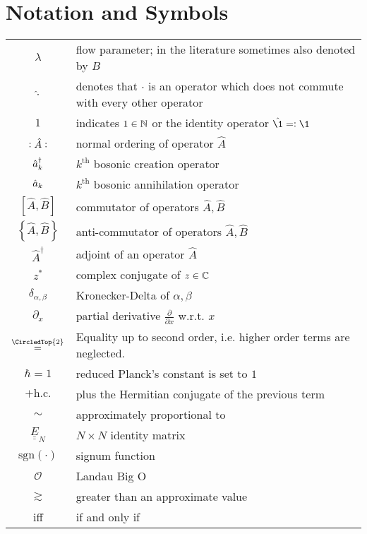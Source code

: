 \chapter*{Notation and Symbols}
\begin{tabular}{cp{}}
  $\lambda$ & flow parameter; in the literature sometimes also denoted by $B$ \\
  $\hat\cdot$ & denotes that $\cdot$ is an operator which does not commute with every other operator\\
  $1$ & indicates $1\in\mathbb{N}$ or the identity operator $\hat{\1}\eqdef \1$\\
  $\vcentcolon \hat A\vcentcolon$ & normal ordering of operator $\hat A$\\ 
  $\hat a^\dagger_k$ & $k^\mathrm{th}$ bosonic creation operator \\
  $\hat a_k$ & $k^\mathrm{th}$ bosonic annihilation operator \\
  $[\hat{ A},\hat{ B}]$ & commutator of operators $\hat{ A},\hat{ B}$ \\
  $\left\{\hat{ A},\hat{ B}\right\}$ & anti-commutator of operators $\hat{ A},\hat{ B}$ \\
  $\hat A^\dagger$ & adjoint of an operator $\hat{ A}$ \\
  $z^*$ & complex conjugate of $z\in\mathbb{C}$ \\
  $\delta_{\alpha,\beta}$ & Kronecker-Delta of $\alpha,\beta$ \\ 
  $\partial_x$ & partial derivative $\frac{\partial}{\partial x}$ w.r.t. $x$\\
  $\overset{\CircledTop{2}}{=}$ & Equality up to second order, i.e. higher order terms are neglected.\\
  $\hbar=1$ & reduced Planck's constant is set to $1$\\
  $+\mathrm{h.c.}$ & plus the Hermitian conjugate of the previous term\\
  $\sim$ & approximately proportional to\\
  $\underline{\underline E}_N$ & $N\times N$ identity matrix\\
  $\mathrm{sgn}\left(\cdot\right)$ & signum function\\
  $\mathcal O$ & Landau Big O\\
  $\gtrsim$ & greater than an approximate value\\
  iff & if and only if
\end{tabular}\\







